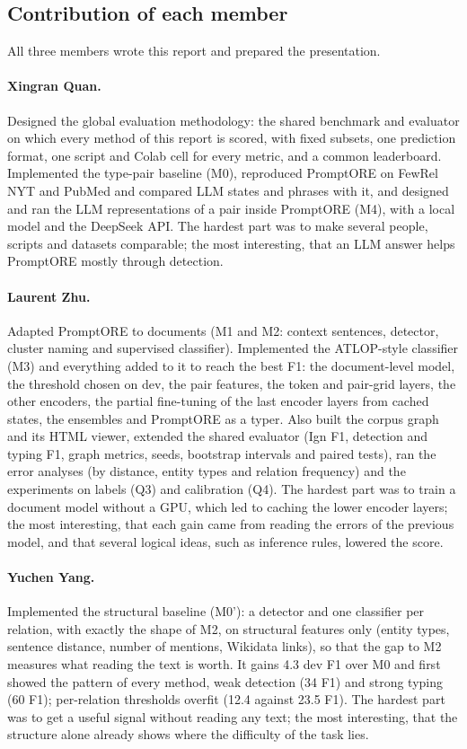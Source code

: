 \documentclass[pdflatex,sn-mathphys-num]{sn-jnl}
\begin{document}
\subsection{Contribution of each member}

All three members wrote this report and prepared the presentation.

\paragraph{Xingran Quan.} Designed the global evaluation methodology: the shared benchmark and evaluator on which every method of this report is scored, with fixed subsets, one prediction format, one script and Colab cell for every metric, and a common leaderboard. Implemented the type-pair baseline (M0), reproduced PromptORE on FewRel NYT and PubMed and compared LLM states and phrases with it, and designed and ran the LLM representations of a pair inside PromptORE (M4), with a local model and the DeepSeek API.
The hardest part was to make several people, scripts and datasets comparable; the most interesting, that an LLM answer helps PromptORE mostly through detection.

\paragraph{Laurent Zhu.} Adapted PromptORE to documents (M1 and M2: context sentences, detector, cluster naming and supervised classifier). Implemented the ATLOP-style classifier (M3) and everything added to it to reach the best F1: the document-level model, the threshold chosen on dev, the pair features, the token and pair-grid layers, the other encoders, the partial fine-tuning of the last encoder layers from cached states, the ensembles and PromptORE as a typer. Also built the corpus graph and its HTML viewer, extended the shared evaluator (Ign F1, detection and typing F1, graph metrics, seeds, bootstrap intervals and paired tests), ran the error analyses (by distance, entity types and relation frequency) and the experiments on labels (Q3) and calibration (Q4).
The hardest part was to train a document model without a GPU, which led to caching the lower encoder layers; the most interesting, that each gain came from reading the errors of the previous model, and that several logical ideas, such as inference rules, lowered the score.

\paragraph{Yuchen Yang.} Implemented the structural baseline (M0'): a detector and one classifier per relation, with exactly the shape of M2, on structural features only (entity types, sentence distance, number of mentions, Wikidata links), so that the gap to M2 measures what reading the text is worth. It gains 4.3 dev F1 over M0 and first showed the pattern of every method, weak detection (34 F1) and strong typing (60 F1); per-relation thresholds overfit (12.4 against 23.5 F1).
The hardest part was to get a useful signal without reading any text; the most interesting, that the structure alone already shows where the difficulty of the task lies.
\end{document}
